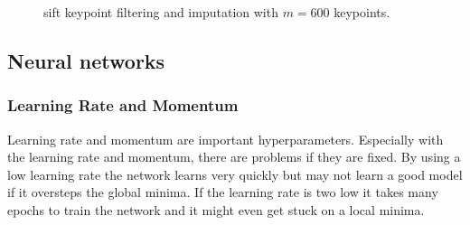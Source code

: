 \begin{figure}[htb]
	\centering
	\hspace{\fill}%
	\hspace{\fill}%
	\hspace{\fill}%
	\hspace{\fill}%
	\caption{\gls{sift} keypoint filtering and imputation with $m=600$ keypoints.}
	\label{fig:keypointFiltering}
\end{figure}


\subsection{Neural networks}
\label{subsec:setupNN}

\subsubsection*{Learning Rate and Momentum}
Learning rate and momentum are important hyperparameters. Especially with the learning rate and momentum, there are problems if they are fixed. By using a low learning rate the network learns very quickly but may not learn a good model if it oversteps the global minima. If the learning rate is two low it takes many epochs to train the network and it might even get stuck on a local minima.

